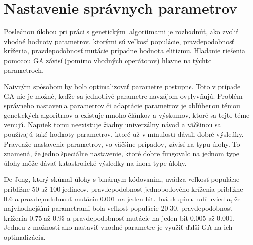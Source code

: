 \section{Nastavenie správnych parametrov}\label{kap2:2.6:Parameters}
Poslednou úlohou pri práci s genetickými algoritmami je rozhodnúť, ako zvoliť vhodné hodnoty parametrov, ktorými sú veľkosť populácie, pravdepodobnosť kríženia, pravdepodobnosť mutácie prípadne hodnota elitizmu. Hľadanie riešenia pomocou GA závisí (pomimo vhodných operátorov) hlavne na týchto parametroch.

Naivným spôsobom by bolo optimalizovať parametre postupne. Toto v prípade GA nie je možné, keďže sa jednotlivé parametre navzájom ovplyvňujú. Problém správneho nastavenia parametrov či adaptácie parametrov je obľúbenou témou genetických algoritmov a existuje mnoho článkov a výskumov, ktoré sa tejto téme venujú. Napriek tomu neexistuje žiadny univerzálny návod a väčšinou sa používajú také hodnoty parametrov, ktoré už v minulosti dávali dobré výsledky. Pravdaže nastavenie parametrov, vo väčšine prípadov, závisí na typu úlohy. To znamená, že jedno špeciálne nastavenie, ktoré dobre fungovalo na jednom type úlohy môže dávať katastrofické výsledky na inom type úlohy.

De Jong, ktorý skúmal úlohy s binárnym kódovaním, uvádza veľkosť populácie približne 50 až 100 jedincov, pravdepodobnosť jednobodového kríženia približne 0.6 a pravdepodobnosť mutácie 0.001 na jeden bit. Iná skupina ľudí uviedla, že najvhodnejšími parametrami bola veľkosť populácie 20-30, pravdepodobnosť kríženia 0.75 až 0.95 a pravdepodobnosť mutácie na jeden bit 0.005 až 0.001. Jednou z možnosti ako nastaviť vhodné parametre je využiť ďalší GA na ich optimalizáciu.